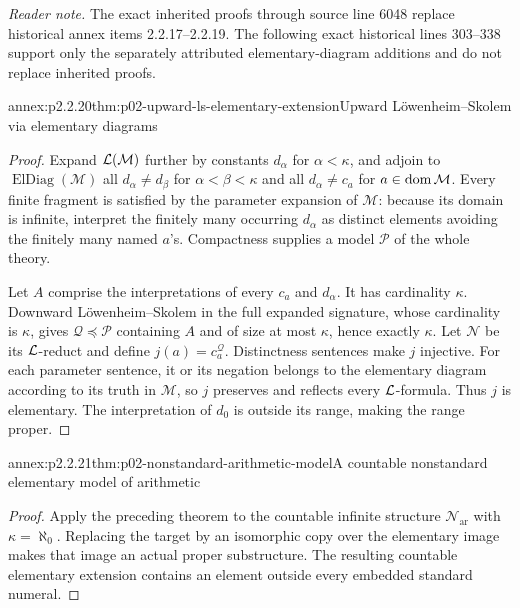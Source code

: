 \noindent\textit{Reader note.} The exact inherited proofs through source line 6048
replace historical annex items 2.2.17--2.2.19.  The following exact historical
lines 303--338 support only the separately attributed elementary-diagram
additions and do not replace inherited proofs.

\begin{annexitem}{annex:p2.2.20}{thm:p02-upward-ls-elementary-extension}{Upward L\"owenheim--Skolem via elementary diagrams}
\begin{proof}
Expand \(\mathcal{L}(\mathcal M)\) further by constants
\(d_\alpha\) for \(\alpha<\kappa\), and adjoin to
\(\operatorname{ElDiag}(\mathcal M)\) all
\(d_\alpha\ne d_\beta\) for \(\alpha<\beta<\kappa\) and all
\(d_\alpha\ne c_a\) for \(a\in\operatorname{dom}\mathcal M\).  Every finite fragment is
satisfied by the parameter expansion of \(\mathcal M\): because its domain
is infinite, interpret the finitely many occurring \(d_\alpha\) as distinct
elements avoiding the finitely many named \(a\)'s.  Compactness supplies a
model \(\mathcal P\) of the whole theory.

Let \(A\) comprise the interpretations of every \(c_a\) and
\(d_\alpha\).  It has cardinality \(\kappa\).  Downward
L\"owenheim--Skolem in the full expanded signature, whose cardinality is
\(\kappa\), gives
\(\mathcal Q\preccurlyeq\mathcal P\) containing \(A\) and of size at most
\(\kappa\), hence exactly \(\kappa\).  Let \(\mathcal N\) be its
\(\mathcal{L}\)-reduct and define \(j(a)=c_a^{\mathcal Q}\).  Distinctness
sentences make \(j\) injective.  For each parameter sentence, it or its
negation belongs to the elementary diagram according to its truth in
\(\mathcal M\), so \(j\) preserves and reflects every \(\mathcal{L}\)-formula.
Thus \(j\) is elementary.  The interpretation of
\(d_0\) is outside its range, making the range proper.
\end{proof}
\end{annexitem}

\begin{annexitem}{annex:p2.2.21}{thm:p02-nonstandard-arithmetic-model}{A countable nonstandard elementary model of arithmetic}
\begin{proof}
Apply the preceding theorem to the countable infinite structure
\(\mathcal N_{\mathrm{ar}}\) with \(\kappa=\aleph_0\).  Replacing the target
by an isomorphic copy over the elementary image makes that image an actual
proper substructure.  The resulting countable elementary extension contains
an element outside every embedded standard numeral.
\end{proof}
\end{annexitem}
